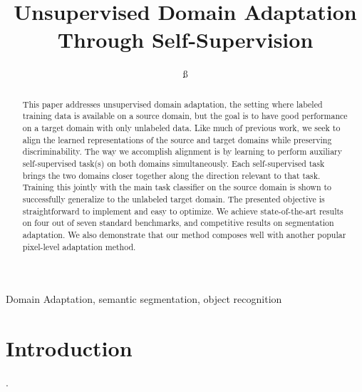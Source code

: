 \documentclass[conference]{IEEEtran}
\begin{document}
\title{Unsupervised Domain Adaptation Through Self-Supervision}

\author{
ß
}

\maketitle

\begin{abstract}
This paper addresses unsupervised domain adaptation, the setting 
where labeled training data is available on a source domain, but
the goal is to have good performance on a target domain with only
unlabeled data. 
Like much of previous work, we seek to align the learned representations
of the source and target domains while preserving discriminability.
The way we accomplish alignment is by learning to perform auxiliary 
self-supervised task(s) on both domains simultaneously. 
Each self-supervised task brings the two domains closer together 
along the direction relevant to that task.
Training this jointly with the main task classifier on the source domain
is shown to successfully generalize to the unlabeled target domain.
The presented objective is straightforward to implement and easy to optimize.
We achieve state-of-the-art results on four out of seven standard benchmarks,
and competitive results on segmentation adaptation.
We also demonstrate that our method composes well with another 
popular pixel-level adaptation method.
\end{abstract}

\begin{IEEEkeywords}
Domain Adaptation, semantic segmentation, object recognition
\end{IEEEkeywords}

\section{Introduction}
\cite{b1}.



\end{document}
